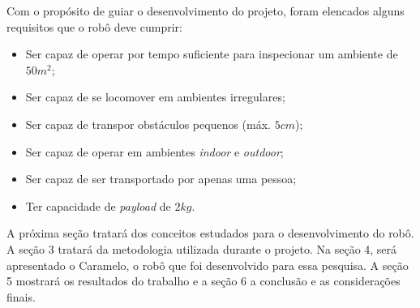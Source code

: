 \documentclass[../main.tex]{subfiles}
\begin{document}
Com o propósito de guiar o desenvolvimento do projeto, foram elencados alguns requisitos que o robô deve cumprir:

\begin{itemize}[noitemsep]
  \item Ser capaz de operar por tempo suficiente para inspecionar um ambiente de $50m^2$;
  \item Ser capaz de se locomover em ambientes irregulares;
  \item Ser capaz de transpor obstáculos pequenos (máx. $5cm$);
  \item Ser capaz de operar em ambientes \textit{indoor} e \textit{outdoor};
  \item Ser capaz de ser transportado por apenas uma pessoa;
  \item Ter capacidade de \textit{payload} de $2kg$.
\end{itemize}

A próxima seção tratará dos conceitos estudados para o desenvolvimento do robô. A seção 3 tratará da metodologia utilizada durante o projeto. Na seção 4, será apresentado o Caramelo, o robô que foi desenvolvido para essa pesquisa. A seção 5 mostrará os resultados do trabalho e a seção 6 a conclusão e as considerações finais.  
\end{document}
